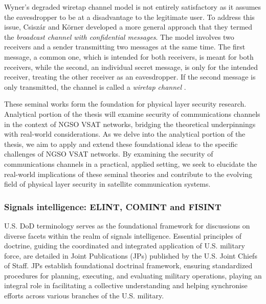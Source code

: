 \documentclass[english, 12pt, a4paper, elec, utf8, a-1b, online]{aaltothesis}
\begin{document}
Wyner's degraded wiretap channel model is not entirely satisfactory as it assumes the eavesdropper to be at a disadvantage to the legitimate user. To address this issue, Csiszár and Körner \cite{csiszar1978broadcast} developed a more general approach that they termed the \textit{broadcast channel with confidential messages}.
The model involves two receivers and a sender transmitting two messages at the same time.
The first message, a common one, which is intended for both receivers, is meant for both receivers, while the second, an individual secret message, is only for the intended receiver, treating the other receiver as an eavesdropper.
If the second message is only transmitted, the channel is called a \textit{wiretap channel} \cite{bloch2011physical}.

These seminal works form the foundation for physical layer security research.
Analytical portion of the thesis will examine security of communications channels in the context of NGSO VSAT networks, bridging the theoretical underpinnings with real-world considerations.
As we delve into the analytical portion of the thesis, we aim to apply and extend these foundational ideas to the specific challenges of NGSO VSAT networks.
By examining the security of communications channels in a practical, applied setting, we seek to elucidate the real-world implications of these seminal theories and contribute to the evolving field of physical layer security in satellite communication systems.


\subsubsection{Signals intelligence: ELINT, COMINT and FISINT}
U.S. DoD terminology serves as the foundational framework for discussions on diverse facets within the realm of signals intelligence.
Essential principles of doctrine, guiding the coordinated and integrated application of U.S. military force, are detailed in Joint Publications (JPs) published by the U.S. Joint Chiefs of Staff.
JPs establish foundational doctrinal framework, ensuring standardized procedures for planning, executing, and evaluating military operations, playing an integral role in facilitating a collective understanding and helping synchronise efforts across various branches of the U.S. military.
\end{document}
